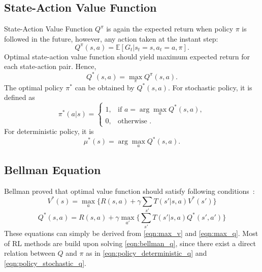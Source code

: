 \subsection{State-Action Value Function}

State-Action Value Function $Q^{\pi}$ is again the expected return when policy $\pi$ is followed in the future, 
however, any action taken at the instant step:
\begin{equation}
Q^{\pi}(s,a) = \mathbb{E}[G_t|s_t=s, a_t=a, \pi]. %
\end{equation}
Optimal state-action value function should yield maximum expected return for each state-action pair. Hence,
\begin{equation}
\label{eqn:max_q}
Q^{*}(s,a) = \max_{\pi} Q^{\pi}(s,a).
\end{equation}
The optimal policy $\pi^*$ can be obtained by $Q^{*}(s,a)$. For stochastic policy, it is defined as  
\begin{equation}
\label{eqn:policy_stochastic_q}
\pi^{*}(a|s) = 
\begin{cases}
1,   & \text{if  } a = \arg\max_{a} Q^{*}(s,a), \\
0,   & \text{otherwise  }.
\end{cases} 
\end{equation}
For deterministic policy, it is
\begin{equation}
\label{eqn:policy_deterministic_q}
\mu^{*}(s) = \arg\max_{a} Q^{*}(s,a).
\end{equation}

\subsection{Bellman Equation}

Bellman proved that optimal value function should satisfy following conditions~\cite{bellman_dynamic_2003}: 
\begin{equation}
\label{eqn:bellman_v}
V^{*}(s) = \max_{a} \Big\{ R(s,a) + \gamma \sum_{s'} T(s'|s,a) V^{*}(s') \Big\}
\end{equation}
\begin{equation}
\label{eqn:bellman_q}
Q^{*}(s,a) = R(s,a) + \gamma \max_{a'} \Big\{ \sum_{s'} T(s'|s,a) Q^{*}(s',a') \Big\}
\end{equation}
These equations can simply be derived from \eqref{eqn:max_v} and \eqref{eqn:max_q}. 
Most of RL methods are build upon solving \eqref{eqn:bellman_q}, since there exist a direct relation between $Q$ and $\pi$ as in \eqref{eqn:policy_deterministic_q} and \eqref{eqn:policy_stochastic_q}.
